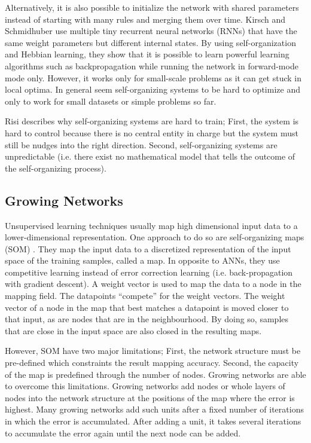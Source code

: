 Alternatively, it is also possible to initialize the network with shared parameters instead of starting with many rules and merging them over time.
Kirsch and Schmidhuber  use multiple tiny recurrent neural networks (RNNs) that have the same weight parameters but different internal states.
By using self-organization and Hebbian learning, they show that it is possible to learn powerful learning algorithms such as backpropagation while running the network in forward-mode mode only.
However, it works only for small-scale problems as it can get stuck in local optima.
In general seem self-organizing systems to be hard to optimize and only to work for small datasets or simple problems so far.

Risi  describes why self-organizing systems are hard to train;
First, the system is hard to control because there is no central entity in charge but the system must still be nudges into the right direction.
Second, self-organizing systems are unpredictable (i.e. there exist no mathematical model that tells the outcome of the self-organizing process).

\subsection{Growing Networks}
Unsupervised learning techniques usually map high dimensional input data to a lower-dimensional representation.
One approach to do so are self-organizing maps (SOM) .
They map the input data to a discretized representation of the input space of the training samples, called a map.
In opposite to ANNs, they use competitive learning instead of error correction learning (i.e. back-propagation with gradient descent).
A weight vector is used to map the data to a node in the mapping field.
The datapoints ``compete'' for the weight vectors.
The weight vector of a node in the map that best matches a datapoint is moved closer to that input, as are nodes that are in the neighbourhood.
By doing so, samples that are close in the input space are also closed in the resulting maps.

However, SOM have two major limitations; First, the network structure must be pre-defined which constraints the result mapping accuracy. Second, the capacity of the map is predefined through the number of nodes.
Growing networks are able to overcome this limitations.
Growing networks add nodes or whole layers of nodes into the network structure at the positions of the map where the error is highest.
Many growing networks  add such units after a fixed number of iterations in which the error is accumulated.
After adding a unit, it takes several iterations to accumulate the error again until the next node can be added.

